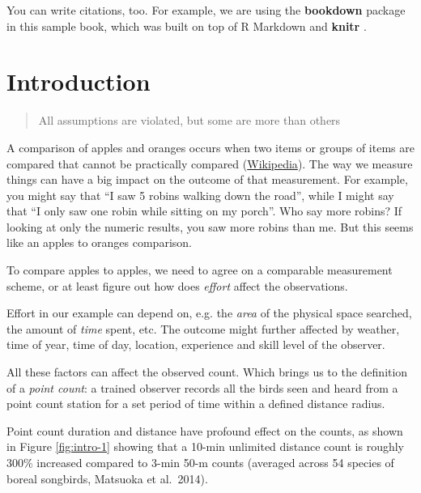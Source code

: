 \documentclass[12pt,]{book}
\begin{document}
You can write citations, too. For example, we are using the \textbf{bookdown} package \citep{R-bookdown} in this sample book, which was built on top of R Markdown and \textbf{knitr} \citep{xie2015}.

\hypertarget{intro}{%
\chapter{Introduction}\label{intro}}

\begin{quote}
All assumptions are violated, but some are more than others
\end{quote}

A comparison of apples and oranges occurs when two items or
groups of items are compared that cannot be practically compared
(\href{https://en.wikipedia.org/wiki/Apples_and_oranges}{Wikipedia}).
The way we measure things can have a big impact on the outcome
of that measurement. For example, you might say that
``I saw 5 robins walking down the road'', while I might say that
``I only saw one robin while sitting on my porch''.
Who say more robins? If looking at only the numeric results,
you saw more robins than me. But this seems like
an apples to oranges comparison.

To compare apples to apples, we need to agree on a comparable
measurement scheme, or at least figure out how does \emph{effort}
affect the observations.

Effort in our example can depend on, e.g.
the \emph{area} of the physical space searched,
the amount of \emph{time} spent, etc.
The outcome might further affected by
weather, time of year, time of day, location,
experience and skill level of the observer.

All these factors can affect the observed count.
Which brings us to the definition of a \emph{point count}:
a trained observer
records all the birds
seen and heard
from a point count station
for a set period of time
within a defined distance radius.

Point count duration and distance have profound effect
on the counts, as shown in Figure \ref{fig:intro-1}
showing that a 10-min unlimited distance count
is roughly 300\% increased compared to 3-min 50-m counts
(averaged across 54 species of boreal songbirds, Matsuoka et al.~2014).
\end{document}
